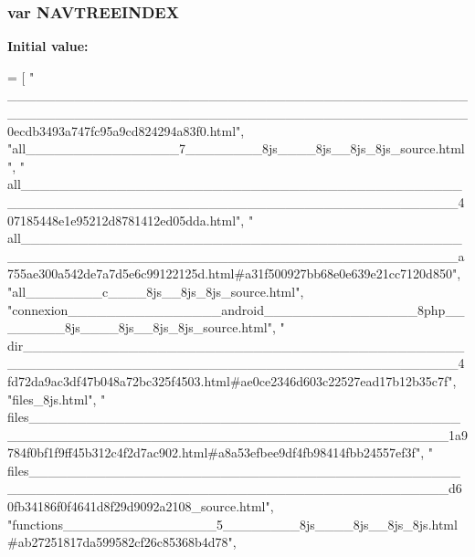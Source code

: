 \subsubsection[{N\+A\+V\+T\+R\+E\+E\+I\+N\+D\+E\+X}]{\setlength{\rightskip}{0pt plus 5cm}var N\+A\+V\+T\+R\+E\+E\+I\+N\+D\+E\+X}\label{navtreedata_8js_a51b2088f00a4f2f20d495e65be359cd8}
{\bfseries Initial value\+:}
\begin{DoxyCode}
=
[
\textcolor{stringliteral}{"
      \_\_\_\_\_\_\_\_\_\_\_\_\_\_\_\_\_\_\_\_\_\_\_\_\_\_\_\_\_\_\_\_\_\_\_\_\_\_\_\_\_\_\_\_\_\_\_\_\_\_\_\_\_\_\_\_\_\_\_\_\_\_\_\_\_\_\_\_\_\_\_\_\_\_\_\_\_\_\_\_\_\_\_\_\_\_\_\_\_\_\_\_\_\_\_\_0ecdb3493a747fc95a9cd824294a83f0.html"},
\textcolor{stringliteral}{"all\_\_\_\_\_\_\_\_\_\_\_\_\_\_\_\_7\_\_\_\_\_\_\_\_8js\_\_\_\_8js\_\_8js\_8js\_source.html"},
\textcolor{stringliteral}{"
      all\_\_\_\_\_\_\_\_\_\_\_\_\_\_\_\_\_\_\_\_\_\_\_\_\_\_\_\_\_\_\_\_\_\_\_\_\_\_\_\_\_\_\_\_\_\_\_\_\_\_\_\_\_\_\_\_\_\_\_\_\_\_\_\_\_\_\_\_\_\_\_\_\_\_\_\_\_\_\_\_\_\_\_\_\_\_\_\_\_\_\_\_\_407185448e1e95212d8781412ed05dda.html"},
\textcolor{stringliteral}{"
      all\_\_\_\_\_\_\_\_\_\_\_\_\_\_\_\_\_\_\_\_\_\_\_\_\_\_\_\_\_\_\_\_\_\_\_\_\_\_\_\_\_\_\_\_\_\_\_\_\_\_\_\_\_\_\_\_\_\_\_\_\_\_\_\_\_\_\_\_\_\_\_\_\_\_\_\_\_\_\_\_\_\_\_\_\_\_\_\_\_\_\_\_\_a755ae300a542de7a7d5e6c99122125d.html#a31f500927bb68e0e639e21cc7120d850"},
\textcolor{stringliteral}{"all\_\_\_\_\_\_\_\_c\_\_\_\_8js\_\_8js\_8js\_source.html"},
\textcolor{stringliteral}{"connexion\_\_\_\_\_\_\_\_\_\_\_\_\_\_\_\_android\_\_\_\_\_\_\_\_\_\_\_\_\_\_\_\_8php\_\_\_\_\_\_\_\_8js\_\_\_\_8js\_\_8js\_8js\_source.html"},
\textcolor{stringliteral}{"
      dir\_\_\_\_\_\_\_\_\_\_\_\_\_\_\_\_\_\_\_\_\_\_\_\_\_\_\_\_\_\_\_\_\_\_\_\_\_\_\_\_\_\_\_\_\_\_\_\_\_\_\_\_\_\_\_\_\_\_\_\_\_\_\_\_\_\_\_\_\_\_\_\_\_\_\_\_\_\_\_\_\_\_\_\_\_\_\_\_\_\_\_\_\_4fd72da9ac3df47b048a72bc325f4503.html#ae0ce2346d603c22527ead17b12b35c7f"},
\textcolor{stringliteral}{"files\_8js.html"},
\textcolor{stringliteral}{"
      files\_\_\_\_\_\_\_\_\_\_\_\_\_\_\_\_\_\_\_\_\_\_\_\_\_\_\_\_\_\_\_\_\_\_\_\_\_\_\_\_\_\_\_\_\_\_\_\_\_\_\_\_\_\_\_\_\_\_\_\_\_\_\_\_\_\_\_\_\_\_\_\_\_\_\_\_\_\_\_\_\_\_\_\_\_\_\_\_\_\_\_1a9784f0bf1f9ff45b312c4f2d7ac902.html#a8a53efbee9df4fb98414fbb24557ef3f"},
\textcolor{stringliteral}{"
      files\_\_\_\_\_\_\_\_\_\_\_\_\_\_\_\_\_\_\_\_\_\_\_\_\_\_\_\_\_\_\_\_\_\_\_\_\_\_\_\_\_\_\_\_\_\_\_\_\_\_\_\_\_\_\_\_\_\_\_\_\_\_\_\_\_\_\_\_\_\_\_\_\_\_\_\_\_\_\_\_\_\_\_\_\_\_\_\_\_\_\_d60fb34186f0f4641d8f29d9092a2108\_source.html"},
\textcolor{stringliteral}{"functions\_\_\_\_\_\_\_\_\_\_\_\_\_\_\_\_5\_\_\_\_\_\_\_\_8js\_\_\_\_8js\_\_8js\_8js.html#ab27251817da599582cf26c85368b4d78"},

\end{DoxyCode}
